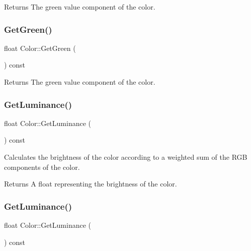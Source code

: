 \begin{DoxyReturn}{Returns}
The green value component of the color. 
\end{DoxyReturn}
\mbox{\label{classColor_a0c1d09e2435aefad98931d765bc36d01}} 
\subsubsection{\texorpdfstring{Get\+Green()}{GetGreen()}\hspace{0.1cm}{\footnotesize\ttfamily [2/2]}}
{\footnotesize\ttfamily float Color\+::\+Get\+Green (\begin{DoxyParamCaption}{ }\end{DoxyParamCaption}) const\hspace{0.3cm}{\ttfamily [inline]}}

\begin{DoxyReturn}{Returns}
The green value component of the color. 
\end{DoxyReturn}
\mbox{\label{classColor_a196417267fdde68255f53164c5eff701}} 
\subsubsection{\texorpdfstring{Get\+Luminance()}{GetLuminance()}\hspace{0.1cm}{\footnotesize\ttfamily [1/2]}}
{\footnotesize\ttfamily float Color\+::\+Get\+Luminance (\begin{DoxyParamCaption}{ }\end{DoxyParamCaption}) const\hspace{0.3cm}{\ttfamily [inline]}}



Calculates the brightness of the color according to a weighted sum of the R\+GB components of the color. 

\begin{DoxyReturn}{Returns}
A float representing the brightness of the color. 
\end{DoxyReturn}
\mbox{\label{classColor_a196417267fdde68255f53164c5eff701}} 
\subsubsection{\texorpdfstring{Get\+Luminance()}{GetLuminance()}\hspace{0.1cm}{\footnotesize\ttfamily [2/2]}}
{\footnotesize\ttfamily float Color\+::\+Get\+Luminance (\begin{DoxyParamCaption}{ }\end{DoxyParamCaption}) const\hspace{0.3cm}{\ttfamily [inline]}}



